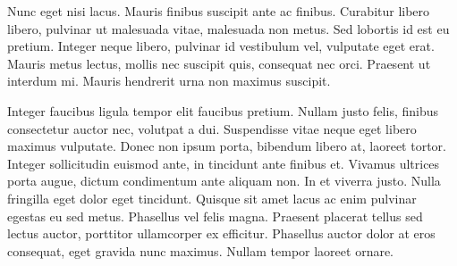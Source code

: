 \documentclass[9pt, letterpaper, twocolumn]{article}
\begin{document}
Nunc eget nisi lacus. Mauris finibus suscipit ante ac finibus. Curabitur libero libero, pulvinar ut malesuada vitae, malesuada non metus. Sed lobortis id est eu pretium. Integer neque libero, pulvinar id vestibulum vel, vulputate eget erat. Mauris metus lectus, mollis nec suscipit quis, consequat nec orci. Praesent ut interdum mi. Mauris hendrerit urna non maximus suscipit.

Integer faucibus ligula tempor elit faucibus pretium. Nullam justo felis, finibus consectetur auctor nec, volutpat a dui. Suspendisse vitae neque eget libero maximus vulputate. Donec non ipsum porta, bibendum libero at, laoreet tortor. Integer sollicitudin euismod ante, in tincidunt ante finibus et. Vivamus ultrices porta augue, dictum condimentum ante aliquam non. In et viverra justo. Nulla fringilla eget dolor eget tincidunt. Quisque sit amet lacus ac enim pulvinar egestas eu sed metus. Phasellus vel felis magna. Praesent placerat tellus sed lectus auctor, porttitor ullamcorper ex efficitur. Phasellus auctor dolor at eros consequat, eget gravida nunc maximus. Nullam tempor laoreet ornare.
\end{document}
